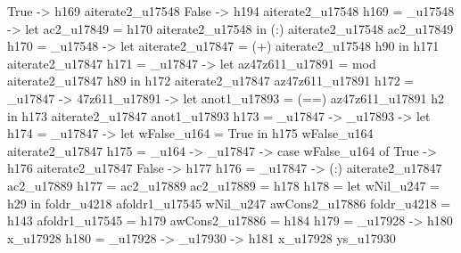                                           True -> h169 aiterate2_u17548
                                          False -> h194 aiterate2_u17548
         h169 = _u17548 -> let ac2_u17849 = h170 aiterate2_u17548
                                     in (:) aiterate2_u17548 ac2_u17849
         h170 = _u17548 -> let
                                       aiterate2_u17847 = (+) aiterate2_u17548 h90
                                     in h171 aiterate2_u17847
         h171 = _u17847 -> let
                                       az47z611_u17891 = mod aiterate2_u17847 h89
                                     in h172 aiterate2_u17847 az47z611_u17891
         h172 = _u17847 -> \az47z611_u17891 -> let
                                                           anot1_u17893 = (==) az47z611_u17891 h2
                                                         in h173 aiterate2_u17847 anot1_u17893
         h173 = _u17847 -> _u17893 -> let
                                                        h174 = _u17847 -> let wFalse_u164 = True
                                                                                    in h175 wFalse_u164 aiterate2_u17847
                                                        h175 = \wFalse_u164 -> _u17847 -> case wFalse_u164 of
                                                                                                      True ->
                                                                                                        h176 aiterate2_u17847
                                                                                                      False ->
                                                                                                        h177
                                                        h176 = _u17847 -> (:) aiterate2_u17847 ac2_u17889
                                                        h177 = ac2_u17889
                                                        ac2_u17889 = h178
                                                        h178 = let wNil_u247 = h29
                                                               in foldr_u4218 afoldr1_u17545 wNil_u247 awCons2_u17886
                                                        foldr_u4218 = h143
                                                        afoldr1_u17545 = h179
                                                        awCons2_u17886 = h184
                                                        h179 = \x_u17928 -> h180 x_u17928
                                                        h180 = \x_u17928 -> \ys_u17930 -> h181 x_u17928 ys_u17930
